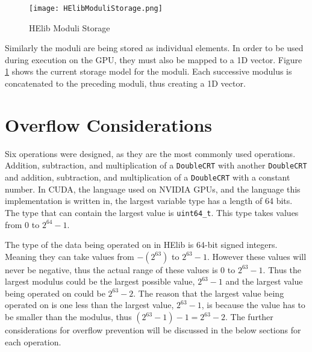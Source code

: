 \begin{figure}[htp]
\centering
\texttt{[image: HElibModuliStorage.png]}
\caption{HElib Moduli Storage}
\label{fig:HElibModuliStorage}
\end{figure}

Similarly the moduli are being stored as individual elements. In order to be used during execution on the GPU, they must also be mapped to a 1D vector. Figure \ref{fig:HElibModuliStorage} shows the current storage model for the moduli. Each successive modulus is concatenated to the preceding moduli, thus creating a 1D vector.

\section{Overflow Considerations} \label{sec:OverflowConsiderations}
Six operations were designed, as they are the most commonly used operations. Addition, subtraction, and multiplication of a \verb|DoubleCRT| with another \verb|DoubleCRT| and addition, subtraction, and multiplication of a \verb|DoubleCRT| with a constant number. In CUDA, the language used on NVIDIA GPUs, and the language this implementation is written in, the largest variable type has a length of 64 bits. The type that can contain the largest value is \verb|uint64_t|. This type takes values from 0 to $2^{64} - 1$. 

The type of the data being operated on in HElib is 64-bit signed integers. Meaning they can take values from $-(2^{63})$ to $2^{63} - 1$. However these values will never be negative, thus the actual range of these values is 0 to $2^{63} - 1$. Thus the largest modulus could be the largest possible value, $2^{63} - 1$ and the largest value being operated on could be $2^{63} - 2$. The reason that the largest value being operated on is one less than the largest value, $2^{63} - 1$, is because the value has to be smaller than the modulus, thus $(2^{63} - 1) - 1 = 2^{63} - 2$. The further considerations for overflow prevention will be discussed in the below sections for each operation.

